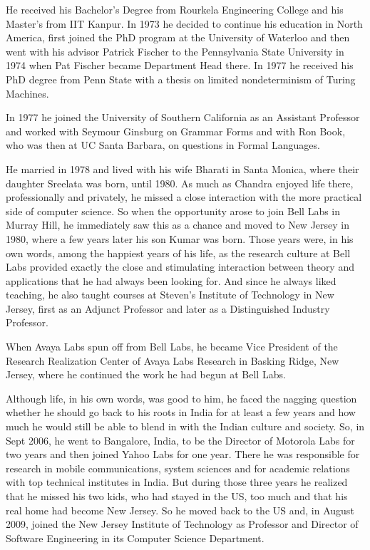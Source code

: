 \documentclass[copyright]{eptcs}
\begin{document}
He received his Bachelor's Degree from Rourkela Engineering College and his Master's from IIT Kanpur. 
In 1973 he decided to continue his education in North America, first joined the PhD program at the University 
of Waterloo and then went with his advisor Patrick Fischer to the Pennsylvania State University in 1974 when 
Pat Fischer became Department Head there. In 1977 he received his PhD degree from Penn State with a thesis on limited nondeterminism of Turing Machines.

In 1977 he joined the University of Southern California as an Assistant Professor and worked with Seymour Ginsburg on 
Grammar Forms and with Ron Book, who was then at UC Santa Barbara, on questions in Formal Languages.

He married in 1978 and lived with his wife Bharati in Santa Monica, where their daughter Sreelata was born, until 1980. 
As much as Chandra enjoyed life there, professionally and privately, he missed a close interaction with the more practical
side of computer science. So when the opportunity arose to join Bell Labs in Murray Hill, he immediately saw this as
a chance and moved to New Jersey in 1980, where a few years later 
his son Kumar was born. 
Those years were, in his own words, among the happiest years of his life, as the research 
culture at Bell Labs provided exactly the close and stimulating interaction between theory and applications 
that he had always been looking for. And since he always liked teaching, he also taught courses at Steven's Institute 
of Technology in New Jersey, first as an Adjunct Professor and later as a Distinguished Industry Professor.

When Avaya Labs spun off from Bell Labs, he became Vice President of 
the Research Realization Center of Avaya Labs Research in Basking Ridge, New Jersey, where he continued the work he had begun at Bell Labs.

Although life, in his own words, was good to him, he faced the nagging question whether he should go back to his roots in 
India for at least a few years and how much he would still 
be able to blend in with the Indian culture and society. So, in Sept 2006, he went to Bangalore, India, to be the 
Director of Motorola Labs for two years and then joined Yahoo Labs for one year. There he was responsible for research in 
mobile communications, system sciences and for academic relations with top technical institutes in India. But 
during those three years he realized that he missed his two kids, who had stayed in the US, too much and that his real 
home had become New Jersey. So he moved back to the US and, in August 2009, joined the New Jersey Institute of Technology 
as Professor and Director of Software Engineering in its Computer Science Department.
\end{document}
